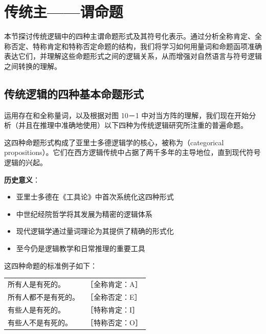 \section{传统主——谓命题}

\begin{logicbox}[title=引言]
本节探讨传统逻辑中的四种主谓命题形式及其符号化表示。通过分析全称肯定、全称否定、特称肯定和特称否定命题的结构，我们将学习如何用量词和命题函项准确表达它们，并理解这些命题形式之间的逻辑关系，从而增强对自然语言与符号逻辑之间转换的理解。
\end{logicbox}

\subsection{传统逻辑的四种基本命题形式}

运用存在和全称量词，以及根据对图 10－1 中对当方阵的理解，我们现在开始分析（并且在推理中准确地使用）以下四种为传统逻辑研究所注重的普遍命题。

\begin{theorembox}[title=四种基本命题形式的历史背景]
这四种命题形式构成了亚里士多德逻辑学的核心，被称为（categorical propositions）。它们在西方逻辑传统中占据了两千多年的主导地位，直到现代符号逻辑的兴起。

\textbf{历史意义}：
\begin{itemize}
\item 亚里士多德在《工具论》中首次系统化这四种形式
\item 中世纪经院哲学将其发展为精密的逻辑体系
\item 现代逻辑学通过量词理论为其提供了精确的形式化
\item 至今仍是逻辑教学和日常推理的重要工具
\end{itemize}
\end{theorembox}

这四种命题的标准例子如下：

\begin{center}
\begin{tabular}{ll}
所有人是有死的。 & ［全称肯定：A］ \\
所有人都不是有死的。 & ［全称否定：E］ \\
有些人是有死的。 & ［特称肯定：I］ \\
有些人不是有死的。 & ［特称否定：O］ \\
\end{tabular}
\end{center}


